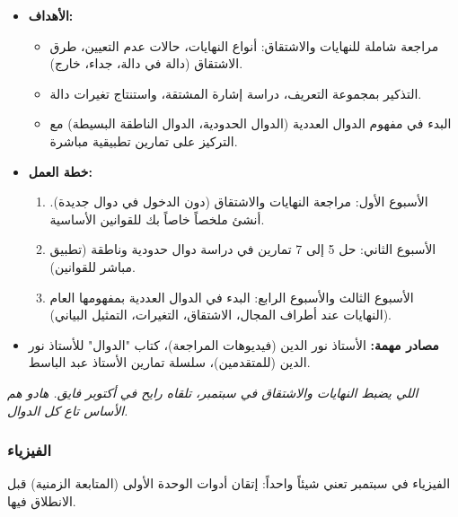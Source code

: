 \documentclass[12pt,a4paper]{book}
\newcommand{\quoteAr}[1]{%
	\begin{myquote}
		\itshape #1
	\end{myquote}
}
\begin{document}
	\begin{itemize}
		\item \textbf{الأهداف:}
		\begin{itemize}
			\item مراجعة شاملة للنهايات والاشتقاق: أنواع النهايات، حالات عدم التعيين، طرق الاشتقاق (دالة في دالة، جداء، خارج).
			\item التذكير بمجموعة التعريف، دراسة إشارة المشتقة، واستنتاج تغيرات دالة.
			\item البدء في مفهوم الدوال العددية (الدوال الحدودية، الدوال الناطقة البسيطة) مع التركيز على تمارين تطبيقية مباشرة.
		\end{itemize}
		\item \textbf{خطة العمل:}
		\begin{enumerate}
			\item الأسبوع الأول: مراجعة النهايات والاشتقاق (دون الدخول في دوال جديدة). أنشئ ملخصاً خاصاً بك للقوانين الأساسية.
			\item الأسبوع الثاني: حل 5 إلى 7 تمارين في دراسة دوال حدودية وناطقة (تطبيق مباشر للقوانين).
			\item الأسبوع الثالث والأسبوع الرابع: البدء في الدوال العددية بمفهومها العام (النهايات عند أطراف المجال، الاشتقاق، التغيرات، التمثيل البياني).
		\end{enumerate}
		\item \textbf{مصادر مهمة:} الأستاذ نور الدين (فيديوهات المراجعة)، كتاب "الدوال" للأستاذ نور الدين (للمتقدمين)، سلسلة تمارين الأستاذ عبد الباسط.
	\end{itemize}
	
	\quoteAr{اللي يضبط النهايات والاشتقاق في سبتمبر، تلقاه رايح في أكتوبر فايق. هادو هم الأساس تاع كل الدوال.}
	
	\subsubsection{الفيزياء}
	
	الفيزياء في سبتمبر تعني شيئاً واحداً: إتقان أدوات الوحدة الأولى (المتابعة الزمنية) قبل الانطلاق فيها.
	
\end{document}
